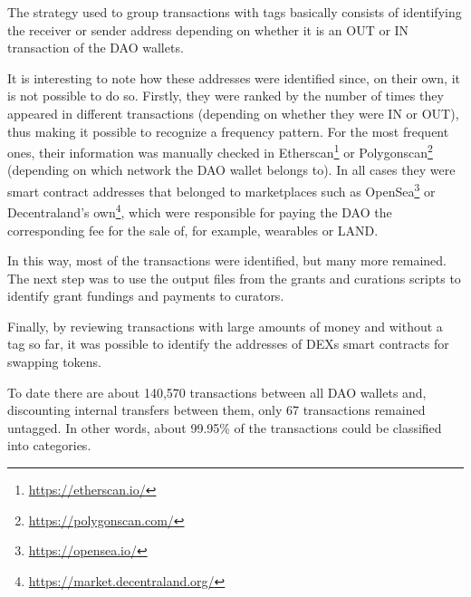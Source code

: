 \documentclass[MSE,Master,english]{twbook}%
\begin{document}
The strategy used to group transactions with tags basically consists of identifying the receiver or sender address depending on whether it is an OUT or IN transaction of the DAO wallets.

It is interesting to note how these addresses were identified since, on their own, it is not possible to do so. Firstly, they were ranked by the number of times they appeared in different transactions (depending on whether they were IN or OUT), thus making it possible to recognize a frequency pattern. For the most frequent ones, their information was manually checked in Etherscan\footnote{\url{https://etherscan.io/}} or Polygonscan\footnote{\url{https://polygonscan.com/}} (depending on which network the DAO wallet belongs to). In all cases they were smart contract addresses that belonged to marketplaces such as OpenSea\footnote{\url{https://opensea.io/}} or Decentraland's own\footnote{\url{https://market.decentraland.org/}}, which were responsible for paying the DAO the corresponding fee for the sale of, for example, wearables or LAND.

In this way, most of the transactions were identified, but many more remained. The next step was to use the output files from the grants and curations scripts to identify grant fundings and payments to curators.

Finally, by reviewing transactions with large amounts of money and without a tag so far, it was possible to identify the addresses of \ac{DEXs} smart contracts for swapping tokens.

To date there are about 140,570 transactions between all DAO wallets and, discounting internal transfers between them, only 67 transactions remained untagged. In other words, about 99.95\% of the transactions could be classified into categories. \\
\end{document}
